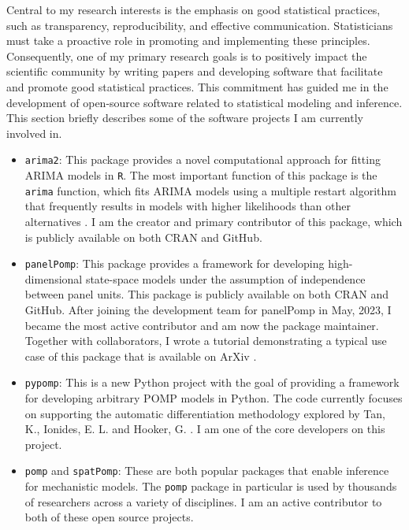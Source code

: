 \documentclass{article}
\begin{document}
Central to my research interests is the emphasis on good statistical practices, such as transparency, reproducibility, and effective communication.
Statisticians must take a proactive role in promoting and implementing these principles.
Consequently, one of my primary research goals is to positively impact the scientific community by writing papers and developing software that facilitate and promote good statistical practices.
This commitment has guided me in the development of open-source software related to statistical modeling and inference.
This section briefly describes some of the software projects I am currently involved in.

\begin{itemize}

      \item \texttt{arima2}: This package provides a novel computational approach for fitting ARIMA models in \texttt{R}. The most important function of this package is the \texttt{arima} function, which fits ARIMA models using a multiple restart algorithm that frequently results in models with higher likelihoods than other alternatives \cite{wheelerARMA}.
    I am the creator and primary contributor of this package, which is publicly available on both CRAN and GitHub.

    \item \texttt{panelPomp}: This package provides a framework for developing high-dimensional state-space models under the assumption of independence between panel units.
    This package is publicly available on both CRAN and GitHub.
    After joining the development team for panelPomp in May, 2023, I became the most active contributor and am now the package maintainer.
    Together with collaborators, I wrote a tutorial demonstrating a typical use case of this package that is available on ArXiv \cite{breto24}.

    \item \texttt{pypomp}: This is a new Python project with the goal of providing a framework for developing arbitrary POMP models in Python. The code currently focuses on supporting the automatic differentiation methodology explored by Tan, K., Ionides, E. L. and Hooker, G. \cite{tan24}. I am one of the core developers on this project.

    \item \texttt{pomp} and \texttt{spatPomp}: These are both popular packages that enable inference for mechanistic models. The \texttt{pomp} package in particular is used by thousands of researchers across a variety of disciplines. I am an active contributor to both of these open source projects.

\end{itemize}



\end{document}
